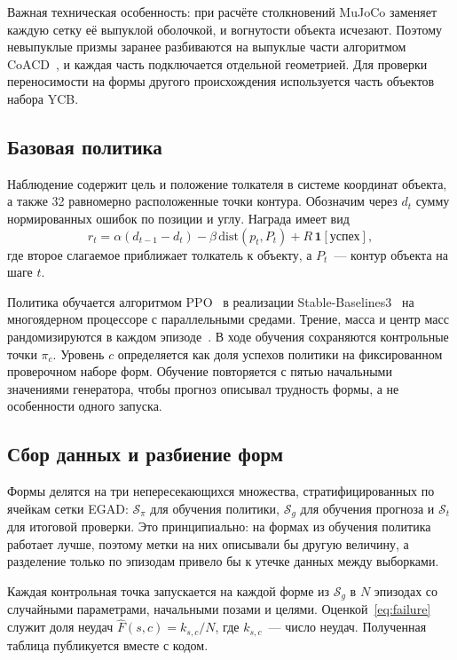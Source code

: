 \documentclass{misisarticle}
\begin{document}
Важная техническая особенность: при расчёте столкновений MuJoCo заменяет каждую сетку её выпуклой оболочкой, и вогнутости объекта исчезают. Поэтому невыпуклые призмы заранее разбиваются на выпуклые части алгоритмом CoACD~\cite{coacd2022}, и каждая часть подключается отдельной геометрией. Для проверки переносимости на формы другого происхождения используется часть объектов набора YCB.

\subsection{Базовая политика}

Наблюдение содержит цель и положение толкателя в системе координат объекта, а также 32 равномерно расположенные точки контура. Обозначим через $d_t$ сумму нормированных ошибок по позиции и углу. Награда имеет вид
\begin{equation}
  r_t = \alpha (d_{t-1} - d_t) - \beta\,\mathrm{dist}(p_t, P_t) + R\,\mathbf{1}[\text{успех}],
  \label{eq:reward}
\end{equation}
где второе слагаемое приближает толкатель к объекту, а $P_t$~--- контур объекта на шаге $t$.

Политика обучается алгоритмом PPO~\cite{ppo2017} в реализации Stable-Baselines3~\cite{sb3} на многоядерном процессоре с параллельными средами. Трение, масса и центр масс рандомизируются в каждом эпизоде~\cite{peng2018}. В ходе обучения сохраняются контрольные точки $\pi_c$. Уровень $c$ определяется как доля успехов политики на фиксированном проверочном наборе форм. Обучение повторяется с пятью начальными значениями генератора, чтобы прогноз описывал трудность формы, а не особенности одного запуска.

\subsection{Сбор данных и разбиение форм}

Формы делятся на три непересекающихся множества, стратифицированных по ячейкам сетки EGAD: $\mathcal{S}_\pi$ для обучения политики, $\mathcal{S}_g$ для обучения прогноза и $\mathcal{S}_t$ для итоговой проверки. Это принципиально: на формах из обучения политика работает лучше, поэтому метки на них описывали бы другую величину, а разделение только по эпизодам привело бы к утечке данных между выборками.

Каждая контрольная точка запускается на каждой форме из $\mathcal{S}_g$ в $N$ эпизодах со случайными параметрами, начальными позами и целями. Оценкой~\eqref{eq:failure} служит доля неудач $\hat{F}(s, c) = k_{s,c}/N$, где $k_{s,c}$~--- число неудач. Полученная таблица публикуется вместе с кодом.
\end{document}
